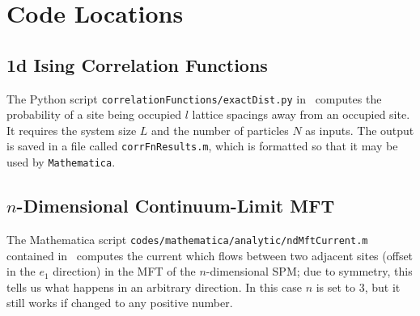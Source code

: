 \chapter{Code Locations}

\section{1d Ising Correlation Functions \label{sec:corrFnCode} }

The Python script \texttt{correlationFunctions/exactDist.py} in~\cite{hellier2019a} computes the probability of a site being occupied $l$ lattice spacings away from an occupied site.
It requires the system size $L$ and the number of particles $N$ as inputs. The output is saved in a file called \texttt{corrFnResults.m}, which is formatted so that it may be used by \texttt{Mathematica}.


\section{$n$-Dimensional Continuum-Limit MFT \label{sec:mftCode}}

The Mathematica script \texttt{codes/mathematica/analytic/ndMftCurrent.m} contained 
in~\cite{hellier2019b} computes the current which flows between two adjacent sites
(offset in the $e_1$ direction) in the MFT of the $n$-dimensional SPM; due to symmetry, this tells us
what happens in an arbitrary direction. In this case $n$ is set to $3$,
but it still works if changed to any positive number.


